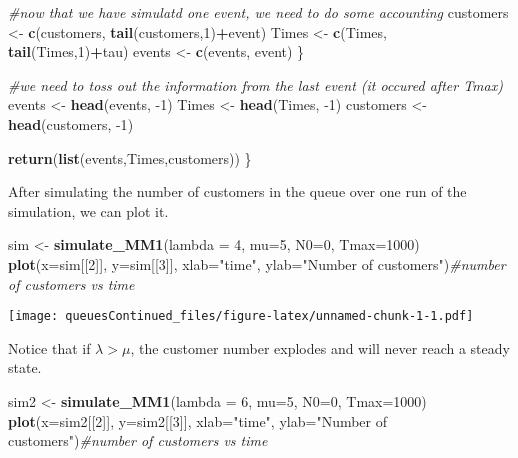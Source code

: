\documentclass[]{article}
\newenvironment{Shaded}{\begin{snugshade}}{\end{snugshade}}
\newcommand{\CommentTok}[1]{\textcolor[rgb]{0.56,0.35,0.01}{\textit{#1}}}
\newcommand{\DataTypeTok}[1]{\textcolor[rgb]{0.13,0.29,0.53}{#1}}
\newcommand{\DecValTok}[1]{\textcolor[rgb]{0.00,0.00,0.81}{#1}}
\newcommand{\KeywordTok}[1]{\textcolor[rgb]{0.13,0.29,0.53}{\textbf{#1}}}
\newcommand{\NormalTok}[1]{#1}
\newcommand{\OperatorTok}[1]{\textcolor[rgb]{0.81,0.36,0.00}{\textbf{#1}}}
\newcommand{\StringTok}[1]{\textcolor[rgb]{0.31,0.60,0.02}{#1}}
\begin{document}
\begin{Shaded}
\begin{Highlighting}[]
    \CommentTok{#now that we have simulatd one event, we need to do some accounting}
\NormalTok{    customers <-}\StringTok{ }\KeywordTok{c}\NormalTok{(customers, }\KeywordTok{tail}\NormalTok{(customers,}\DecValTok{1}\NormalTok{)}\OperatorTok{+}\NormalTok{event)}
\NormalTok{    Times <-}\StringTok{ }\KeywordTok{c}\NormalTok{(Times, }\KeywordTok{tail}\NormalTok{(Times,}\DecValTok{1}\NormalTok{)}\OperatorTok{+}\NormalTok{tau)}
\NormalTok{    events <-}\StringTok{ }\KeywordTok{c}\NormalTok{(events, event)}
\NormalTok{  \}}
  
  \CommentTok{#we need to toss out the information from the last event (it occured after Tmax)}
\NormalTok{  events <-}\StringTok{ }\KeywordTok{head}\NormalTok{(events, }\DecValTok{-1}\NormalTok{)}
\NormalTok{  Times <-}\StringTok{ }\KeywordTok{head}\NormalTok{(Times, }\DecValTok{-1}\NormalTok{)}
\NormalTok{  customers <-}\StringTok{ }\KeywordTok{head}\NormalTok{(customers, }\DecValTok{-1}\NormalTok{)}
  
  \KeywordTok{return}\NormalTok{(}\KeywordTok{list}\NormalTok{(events,Times,customers))}
\NormalTok{\}}
\end{Highlighting}
\end{Shaded}

After simulating the number of customers in the queue over one run of
the simulation, we can plot it.

\begin{Shaded}
\begin{Highlighting}[]
\NormalTok{sim <-}\StringTok{ }\KeywordTok{simulate_MM1}\NormalTok{(}\DataTypeTok{lambda =} \DecValTok{4}\NormalTok{, }\DataTypeTok{mu=}\DecValTok{5}\NormalTok{, }\DataTypeTok{N0=}\DecValTok{0}\NormalTok{, }\DataTypeTok{Tmax=}\DecValTok{1000}\NormalTok{)}
\KeywordTok{plot}\NormalTok{(}\DataTypeTok{x=}\NormalTok{sim[[}\DecValTok{2}\NormalTok{]], }\DataTypeTok{y=}\NormalTok{sim[[}\DecValTok{3}\NormalTok{]], }\DataTypeTok{xlab=}\StringTok{"time"}\NormalTok{, }\DataTypeTok{ylab=}\StringTok{"Number of customers"}\NormalTok{)}\CommentTok{#number of customers vs time}
\end{Highlighting}
\end{Shaded}

\texttt{[image: queuesContinued\_files/figure-latex/unnamed-chunk-1-1.pdf]}

Notice that if \(\lambda > \mu\), the customer number explodes and will
never reach a steady state.

\begin{Shaded}
\begin{Highlighting}[]
\NormalTok{sim2 <-}\StringTok{ }\KeywordTok{simulate_MM1}\NormalTok{(}\DataTypeTok{lambda =} \DecValTok{6}\NormalTok{, }\DataTypeTok{mu=}\DecValTok{5}\NormalTok{, }\DataTypeTok{N0=}\DecValTok{0}\NormalTok{, }\DataTypeTok{Tmax=}\DecValTok{1000}\NormalTok{)}
\KeywordTok{plot}\NormalTok{(}\DataTypeTok{x=}\NormalTok{sim2[[}\DecValTok{2}\NormalTok{]], }\DataTypeTok{y=}\NormalTok{sim2[[}\DecValTok{3}\NormalTok{]], }\DataTypeTok{xlab=}\StringTok{"time"}\NormalTok{, }\DataTypeTok{ylab=}\StringTok{"Number of customers"}\NormalTok{)}\CommentTok{#number of customers vs time}
\end{Highlighting}
\end{Shaded}
\end{document}
